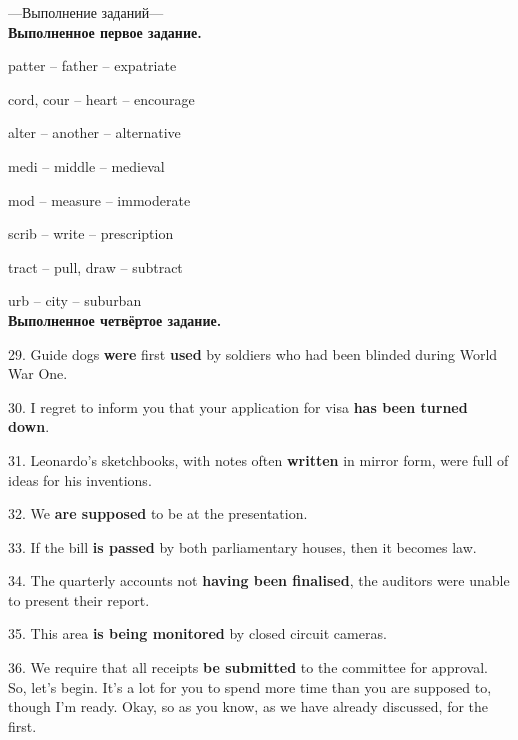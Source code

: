 \documentclass[main.tex]{subfiles}
\begin{document}
---Выполнение заданий---
\\

\textbf{Выполненное первое задание.}

patter -- father -- expatriate

cord, cour -- heart -- encourage

alter -- another -- alternative

medi -- middle -- medieval

mod -- measure -- immoderate

scrib -- write -- prescription

tract -- pull, draw -- subtract

urb -- city -- suburban
\\

\textbf{Выполненное четвёртое задание.}

29. Guide dogs \textbf{were} first \textbf{used} by soldiers who had been blinded during World War One.

30. I regret to inform you that your application for visa \textbf{has been turned down}.

31. Leonardo's sketchbooks, with notes often \textbf{written} in mirror form, were full of ideas for his inventions.

32. We \textbf{are supposed} to be at the presentation.

33. If the bill \textbf{is passed} by both parliamentary houses, then it becomes law.

34. The quarterly accounts not \textbf{having been finalised}, the auditors were unable to present their report.

35. This area \textbf{is being monitored} by closed circuit cameras.

36. We require that all receipts \textbf{be submitted} to the committee for approval.
\\

So, let's begin.
It's a lot for you to spend more time than you are supposed to, though I'm ready.
Okay, so as you know, as we have already discussed, for the first.
\end{document}
